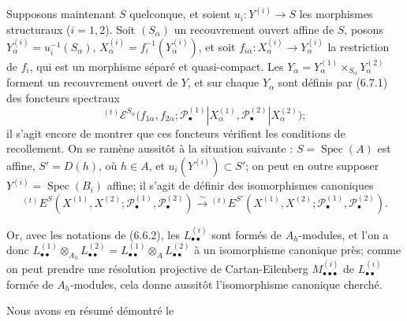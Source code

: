 \begin{env}[6.7.2]
Supposons maintenant $S$ quelconque, et soient
$u_i:Y^{(i)}\to S$ les morphismes structuraux ($i=1,2$). Soit $(S_\alpha)$ un
recouvrement ouvert affine de $S$, posons
$Y_\alpha^{(i)}=u_i^{-1}(S_\alpha)$,
$X_\alpha^{(i)}=f_i^{-1}(Y_\alpha^{(i)})$, et soit
$f_{i\alpha}:X_\alpha^{(i)}\to Y_\alpha^{(i)}$ la restriction de $f_i$, qui
est un morphisme séparé et quasi-compact. Les
$Y_\alpha=Y_\alpha^{(1)}\times_{S_\alpha}Y_\alpha^{(2)}$ forment un
recouvrement ouvert de $Y$, et sur chaque $Y_\alpha$ sont définis par (6.7.1)
des foncteurs spectraux
\[
  {}^{(t)}\mathscr E^{S_\alpha}
  \bigl(f_{1\alpha},f_{2\alpha};
    \mathscr P_\bullet^{(1)}|X_\alpha^{(1)},
    \mathscr P_\bullet^{(2)}|X_\alpha^{(2)}\bigr);
\]
il s'agit encore de montrer que ces foncteurs vérifient les conditions de
recollement.
On se ramène aussitôt à la situation suivante :
$S=\operatorname{Spec}(A)$ est affine, $S'=D(h)$, où $h\in A$, et
$u_i(Y^{(i)})\subset S'$; on peut en outre supposer
$Y^{(i)}=\operatorname{Spec}(B_i)$ affine; il s'agit de définir des
isomorphismes canoniques
\[
  {}^{(t)}E^S
  (X^{(1)},X^{(2)};
   \mathscr P_\bullet^{(1)},\mathscr P_\bullet^{(2)})
  \xrightarrow{\sim}
  {}^{(t)}E^{S'}
  (X^{(1)},X^{(2)};
   \mathscr P_\bullet^{(1)},\mathscr P_\bullet^{(2)}).
  \tag{6.7.2.1}\label{III.6.7.2.1.fr}
\]

Or, avec les notations de (6.6.2), les $L_{\bullet\bullet}^{(i)}$ sont formés
de $A_h$-modules, et l'on a donc
$L_{\bullet\bullet}^{(1)}\otimes_{A_h}L_{\bullet\bullet}^{(2)}
=L_{\bullet\bullet}^{(1)}\otimes_A L_{\bullet\bullet}^{(2)}$ à un
isomorphisme canonique près; comme on peut prendre une résolution projective
de Cartan-Eilenberg $M_{\bullet\bullet\bullet}^{(i)}$ de
$L_{\bullet\bullet}^{(i)}$ formée de $A_h$-modules, cela donne aussitôt
l'isomorphisme canonique cherché.
\end{env}

Nous avons en résumé démontré le

